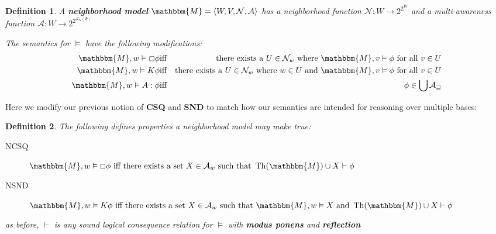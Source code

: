\documentclass{acmconf}
\newcommand{\tmop}[1]{\ensuremath{\operatorname{#1}}}
\newcommand{\tmstrong}[1]{\textbf{#1}}
\newcommand{\tmtextbf}[1]{{\bfseries{#1}}}
\newenvironment{descriptiondash}{\begin{description} }{\end{description}}
\newtheorem{definition}{Definition}
\begin{document}
\begin{definition}
  \label{neighborhoodmodels}A {\tmstrong{neighborhood model}} $\mathbbm{M}=
  \langle W, V, \mathcal{N}, \mathcal{A} \rangle$ has a neighborhood function
  $\mathcal{N} : W \rightarrow 2^{2^W}$ and a multi-awareness function
  $\mathcal{A} : W \rightarrow 2^{2^{\mathcal{L}_N (\Phi)}}$
  
  
  
  The semantics for $\vDash$ have the following modifications:
  \begin{eqnarray*}
    \mathbbm{M}, w \vDash \Box \phi & \text{iff} & \text{there exists a $U \in
    \mathcal{N}_w$ where $\mathbbm{M}, v \vDash \phi$ for all $v \in U$}\\
    \mathbbm{M}, w \vDash K \phi & \text{iff} & \text{there exists a $U \in
    \mathcal{N}_w$ where $w \in U$ and $\mathbbm{M}, v \vDash \phi$ for all $v
    \in U$}\\
    \mathbbm{M}, w \vDash A : \phi & \text{iff} & \phi \in \bigcup
    \mathcal{A_w}
  \end{eqnarray*}
\end{definition}

Here we modify our previous notion of \tmtextbf{CSQ} and \tmtextbf{SND} to
match how our semantics are intended for reasoning over multiple bases:

\begin{definition}
  The following defines properties a neighborhood model may make true:
  
  \begin{descriptiondash}
    \item[NCSQ] $\mathbbm{M}, w \vDash \Box \phi \text{ iff there exists a set
    $X \in \mathcal{A}_w$ such that } \tmop{Th} (\mathbbm{M}) \cup X \vdash
    \phi$
    
    \item[NSND] $\mathbbm{M}, w \vDash K \phi \text{ iff there exists a set $X
    \in \mathcal{A}_w$ such that $\mathbbm{M}, w \vDash X$ and } \tmop{Th}
    (\mathbbm{M}) \cup X \vdash \phi$
  \end{descriptiondash}
  
  as before, $\vdash$ is any sound logical consequence relation for $\vDash$
  with \tmtextbf{modus ponens} and \tmtextbf{reflection}
\end{definition}
\end{document}
